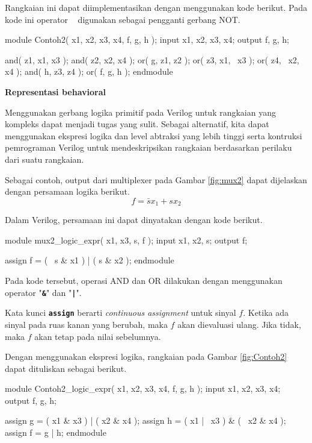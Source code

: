 Rangkaian ini dapat diimplementasikan dengan menggunakan kode berikut.
Pada kode ini operator {\tt \textbf{~}} digunakan sebagai pengganti gerbang
NOT.
{
\begin{verilogcode}
module Contoh2( x1, x2, x3, x4, f, g, h );
  input x1, x2, x3, x4;
  output f, g, h;

  and( z1, x1, x3 );
  and( z2, x2, x4 );
  or( g, z1, z2 );
  or( z3, x1, ~x3 );
  or( z4, ~x2, x4 );
  and( h, z3, z4 );
  or( f, g, h );
endmodule
\end{verilogcode}
}

\textbf{Representasi behavioral}

Menggunakan gerbang logika primitif pada Verilog untuk rangkaian yang
kompleks dapat menjadi tugas yang sulit.
Sebagai alternatif, kita dapat menggunakan ekspresi logika dan
level abtraksi yang lebih tinggi
serta kontruksi pemrograman Verilog untuk mendeskripsikan rangkaian
berdasarkan perilaku dari suatu rangkaian.

Sebagai contoh, output dari multiplexer pada Gambar \ref{fig:mux2}
dapat dijelaskan dengan persamaan logika berikut.
\begin{equation*}
f = \bar{s}x_1 + sx_2
\end{equation*}

Dalam Verilog, persamaan ini dapat dinyatakan dengan kode berikut.
{
\begin{verilogcode}
module mux2_logic_expr( x1, x3, s, f );
  input x1, x2, s;
  output f;

  assign f = ( ~s & x1 ) | ( s & x2 );
endmodule
\end{verilogcode}
}

Pada kode tersebut, operasi AND dan OR dilakukan dengan menggunakan
operator "{\tt\textbf{\&}}" dan "{\tt\textbf{|}}".

Kata kunci {\tt\textbf{assign}} berarti {\it continuous assignment} untuk
sinyal $f$.
Ketika ada sinyal pada ruas kanan yang berubah, maka $f$ akan dievaluasi ulang.
Jika tidak, maka $f$ akan tetap pada nilai sebelumnya.

Dengan menggunakan ekspresi logika, rangkaian pada Gambar \ref{fig:Contoh2}
dapat dituliskan sebagai berikut.
{
\begin{verilogcode}
module Contoh2_logic_expr( x1, x2, x3, x4, f, g, h );
  input x1, x2, x3, x4;
  output f, g, h;

  assign g = ( x1 &  x3 ) | (  x2 & x4 );
  assign h = ( x1 | ~x3 ) & ( ~x2 & x4 );
  assign f = g | h;
endmodule
\end{verilogcode}
}

